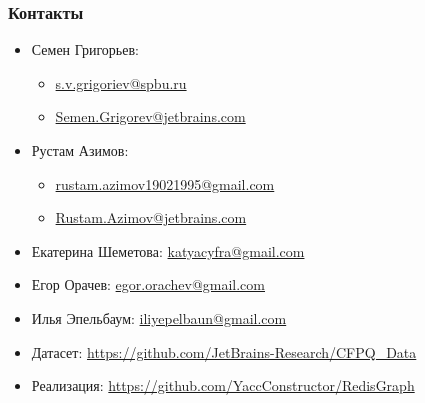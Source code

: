 \documentclass[xcolor=table,english]{beamer}
\begin{document}
\begin{frame} \frametitle{Контакты}
    \begin{itemize}
        \item Семен Григорьев:
        \begin{itemize}
          \item \href{mailto:s.v.grigoriev@spbu.ru}{s.v.grigoriev@spbu.ru}
          \item \href{mailto:Semen.Grigorev@jetbrains.com}{Semen.Grigorev@jetbrains.com}
        \end{itemize}
        \item Рустам Азимов:
        \begin{itemize}
      	    \item \href{mailto:rustam.azimov19021995@gmail.com}{rustam.azimov19021995@gmail.com}
      	    \item \href{mailto:Rustam.Azimov@jetbrains.com}{Rustam.Azimov@jetbrains.com}
        \end{itemize}
        \item Екатерина Шеметова:  \href{mailto:katyacyfra@gmail.com}{katyacyfra@gmail.com}
        \item Егор Орачев: \href{mailto:egor.orachev@gmail.com}{egor.orachev@gmail.com}
        \item Илья Эпельбаум: \href{mailto:iliyepelbaun@gmail.com}{iliyepelbaun@gmail.com}
        \vspace{0.5cm}
        \item Датасет: \href{https://github.com/JetBrains-Research/CFPQ_Data}{https://github.com/JetBrains-Research/CFPQ\_Data}
        \item Реализация: \href{https://github.com/YaccConstructor/RedisGraph}{https://github.com/YaccConstructor/RedisGraph}
    \end{itemize}
    \vspace{0.1cm}
\end{frame}
\end{document}

